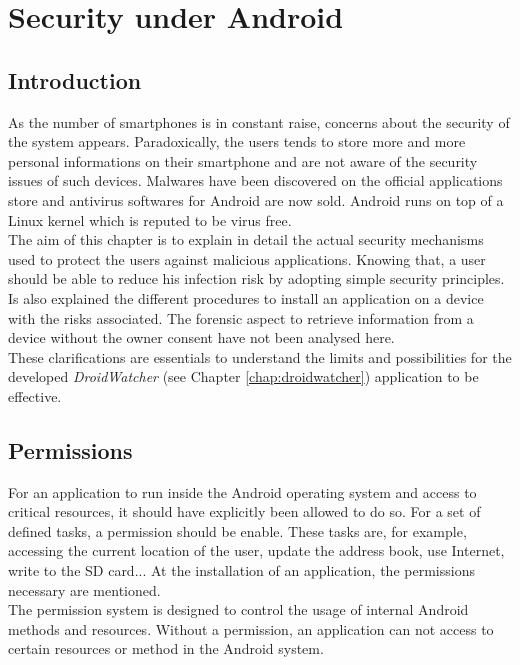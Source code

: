 \chapter{Security under Android}
\label{chap:and-secu}

\section*{Introduction}
As the number of smartphones is in constant raise, concerns about the security of the system appears.
Paradoxically, the users tends to store more and more personal informations on their smartphone and are not aware of the security issues of such devices.
Malwares have been discovered on the official applications store and antivirus softwares for Android are now sold.
Android runs on top of a Linux kernel which is reputed to be virus free.\\

The aim of this chapter is to explain in detail the actual security mechanisms used to protect the users against malicious applications.
Knowing that, a user should be able to reduce his infection risk by adopting simple security principles.
Is also explained the different procedures to install an application on a device with the risks associated.
The forensic aspect to retrieve information from a device without the owner consent have not been analysed here.\\

These clarifications are essentials to understand the limits and possibilities for the developed \emph{DroidWatcher} (see Chapter \ref{chap:droidwatcher}) application to be effective.

\section{Permissions}
For an application to run inside the Android operating system and access to critical resources, it should have explicitly been allowed to do so.
For a set of defined tasks, a permission should be enable.
These tasks are, for example, accessing the current location of the user, update the address book, use Internet, write to the SD card...
At the installation of an application, the permissions necessary are mentioned.\\

The permission system is designed to control the usage of internal Android methods and resources.
Without a permission, an application can not access to certain resources or method in the Android system.

